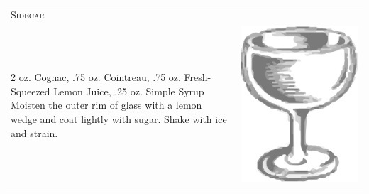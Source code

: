 \documentclass{article}
\begin{document}
\begin{tabular}{p{2in} p{0.5in}}
\multicolumn{2}{p{3in}}{\centering\Huge\textsc{Sidecar}} \\ 
   \vspace{-0.1in}2 oz. Cognac, .75 oz. Cointreau, .75 oz.  Fresh-Squeezed Lemon Juice, .25 oz. Simple Syrup Moisten the outer rim of glass with a lemon wedge and coat lightly with sugar. Shake with ice and strain. &  
   \vspace{-0.1in} \includegraphics{coupe.png}
\end{tabular}
\end{document}
